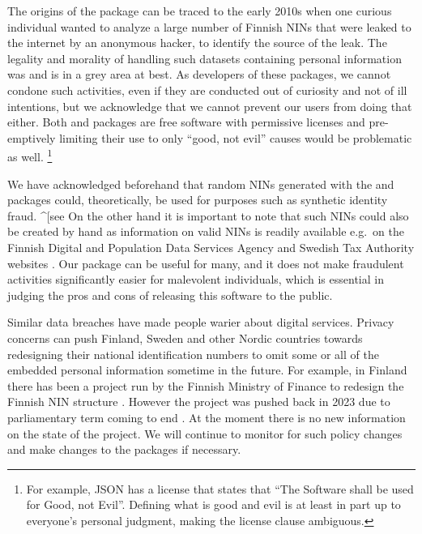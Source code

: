 The origins of the  package can be traced to the early 2010s when one curious individual wanted to analyze a large number of Finnish NINs that were leaked to the internet by an anonymous hacker, to identify the source of the leak. The legality and morality of handling such datasets containing personal information was and is in a grey area at best. As developers of these packages, we cannot condone such activities, even if they are conducted out of curiosity and not of ill intentions, but we acknowledge that we cannot prevent our users from doing that either. Both  and  packages are free software with permissive licenses and pre-emptively limiting their use to only ``good, not evil'' causes would be problematic as well. \footnote{For example, JSON has a license that states that ``The Software shall be used for Good, not Evil''. Defining what is good and evil is at least in part up to everyone's personal judgment, making the license clause ambiguous.}

We have acknowledged beforehand that random NINs generated with the  and  packages could, theoretically, be used for purposes such as synthetic identity fraud. \^{}{[}see \citep[32 for a short description of synthetic fraud related to American SSNs]{brensinger2021} On the other hand it is important to note that such NINs could also be created by hand as information on valid NINs is readily available e.g.~on the Finnish Digital and Population Data Services Agency and Swedish Tax Authority websites \citep{hetudvv, sv2007}. Our package can be useful for many, and it does not make fraudulent activities significantly easier for malevolent individuals, which is essential in judging the pros and cons of releasing this software to the public.

Similar data breaches have made people warier about digital services. Privacy concerns can push Finland, Sweden and other Nordic countries towards redesigning their national identification numbers to omit some or all of the embedded personal information sometime in the future. For example, in Finland there has been a project run by the Finnish Ministry of Finance to redesign the Finnish NIN structure \citep{valtiovarainministerio2022}. However the project was pushed back in 2023 due to parliamentary term coming to end \citep{hetupostponed}. At the moment there is no new information on the state of the project. We will continue to monitor for such policy changes and make changes to the packages if necessary.

